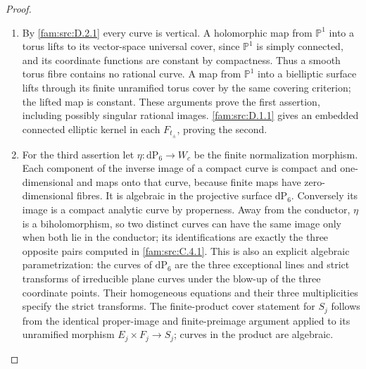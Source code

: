\begin{proof}
\begin{enumerate}[label=\arabic*.,leftmargin=*]
\item By \ref{fam:src:D.2.1} every curve is vertical. A holomorphic map from
\(\mathbb P^1\) into a torus lifts to its vector-space universal cover,
since \(\mathbb P^1\) is simply connected, and its coordinate functions
are constant by compactness. Thus a smooth torus fibre contains no
rational curve. A map from \(\mathbb P^1\) into a bielliptic surface
lifts through its finite unramified torus cover by the same covering
criterion; the lifted map is constant. These arguments prove the first
assertion, including possibly singular rational images.
\ref{fam:src:D.1.1} gives an embedded connected elliptic kernel in each \(F_{t_\pm}\),
proving the second.

\item For the third assertion let \(\eta:\mathrm{dP}_6\to W_c\) be the finite
normalization morphism. Each component of the inverse image of a compact
curve is compact and one-dimensional and maps onto that curve, because
finite maps have zero-dimensional fibres. It is algebraic in the
projective surface \(\mathrm{dP}_6\). Conversely its image is a compact
analytic curve by properness. Away from the conductor, \(\eta\) is a
biholomorphism, so two distinct curves can have the same image only when
both lie in the conductor; its identifications are exactly the three
opposite pairs computed in \ref{fam:src:C.4.1}. This is also an explicit algebraic
parametrization: the curves of \(\mathrm{dP}_6\) are the three exceptional
lines and strict transforms of irreducible plane curves under the blow-up
of the three coordinate points. Their homogeneous equations and their
three multiplicities specify the strict transforms. The finite-product
cover statement for \(S_j\) follows from the identical proper-image and
finite-preimage argument applied to its unramified morphism
\(E_j\times F_j\to S_j\); curves in the product are algebraic.
\end{enumerate}
\end{proof}

